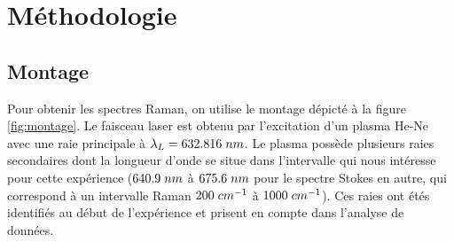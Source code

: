 \documentclass[10pt,letterpaper,twocolumn]{article}
\newcommand{\s}{\hspace{0.1cm}}
\begin{document}
\section{Méthodologie}\label{sec:metho} %

\subsection{Montage}
Pour obtenir les spectres Raman, on utilise le montage dépicté à la figure \ref{fig:montage}. Le faisceau laser est obtenu par l'excitation d'un plasma He-Ne avec une raie principale à $\lambda_L = 632.816\s nm$. Le plasma possède plusieurs raies secondaires dont la longueur d'onde se situe dans l'intervalle qui nous intéresse pour cette expérience ($640.9\s nm$ à $675.6\s nm$ pour le spectre Stokes en autre, qui correspond à un intervalle Raman $200\s cm^{-1}$ à $1000\s cm^{-1}$). Ces raies ont étés identifiés au début de l'expérience et prisent en compte dans l'analyse de données. \par
\end{document}

